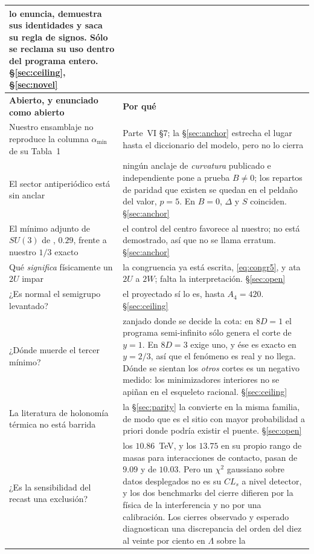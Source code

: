 \documentclass[11pt,a4paper]{article}
\newcommand{\su}[1]{SU(#1)}
\newcommand{\amin}{\alpha_{\min}}
\begin{document}
\begin{longtable}{p{}p{}}
\cite{CCD24} lo enuncia, demuestra sus identidades y saca su regla de signos. Sólo se reclama su uso
dentro del programa entero. \S\ref{sec:ceiling}, \S\ref{sec:novel}\\
\midrule
\rowcolor{amber!14}\textbf{Abierto, y enunciado como abierto} & \textbf{Por qué}\\
\midrule
Nuestro ensamblaje no reproduce la columna $\amin$ de su Tabla~1 & Parte~VI \S7; la \S\ref{sec:anchor}
estrecha el lugar hasta el diccionario del modelo, pero no lo cierra\\
El sector antiperiódico está sin anclar & ningún anclaje de \emph{curvatura} publicado e
independiente pone a prueba $B\neq0$; los repartos de paridad que existen se quedan en el peldaño
del valor, $p=5$. En $B=0$, $\Delta$ y $S$ coinciden. \S\ref{sec:anchor}\\
El mínimo adjunto de $\su3$ de \cite{vGIQ}, $0.29$, frente a nuestro $1/3$ exacto & el control del
centro favorece al nuestro; no está demostrado, así que no se llama erratum. \S\ref{sec:anchor}\\
Qué \emph{significa} físicamente un $2U$ impar & la congruencia ya está escrita,
\eqref{eq:congr5}, y ata $2U$ a $2W$; falta la interpretación. \S\ref{sec:open}\\
¿Es normal el semigrupo levantado? & el proyectado sí lo es, hasta $A_4=420$. \S\ref{sec:ceiling}\\
¿Dónde muerde el tercer mínimo? & zanjado donde se decide la cota: en $8D=1$ el programa
semi-infinito sólo genera el corte de $y=1$. En $8D=3$ exige uno, y ése es exacto en $y=2/3$, así
que el fenómeno es real y no llega. Dónde se sientan los \emph{otros} cortes es un negativo
medido: los minimizadores interiores no se apiñan en el esqueleto racional.
\S\ref{sec:ceiling}\\
La literatura de holonomía térmica no está barrida & la \S\ref{sec:parity} la convierte en la misma
familia, de modo que es el sitio con mayor probabilidad a priori donde podría existir el puente.
\S\ref{sec:open}\\
¿Es la sensibilidad del recast una exclusión? & los $10.86$~TeV, y los $13.75$ en su propio rango
de masas para interacciones de contacto, pasan de $9.09$ y de $10.03$. Pero un $\chi^2$ gaussiano
sobre datos desplegados no es su $CL_s$ a nivel detector, y los dos benchmarks del cierre difieren
por la física de la interferencia y no por una calibración. Los cierres observado y esperado
diagnostican una discrepancia del orden del diez al veinte por ciento en $\Lambda$ sobre la

\end{longtable}
\end{document}
